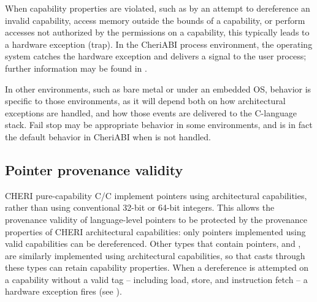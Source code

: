 \documentclass[12pt,twoside,openright,usletter]{article}
\newcommand{\ccode}[1]{{\small\ttfamily{#1}}}
\newcommand{\cuintptrt}{{\ccode{uintptr\_t}}\xspace}
\newcommand{\cintptrt}{{\ccode{intptr\_t}}\xspace}
\newcommand{\SIGPROT}{{\ccode{SIGPROT}}\xspace}
\newcommand{\note}[2]{{\color{blue}[ Note: #1 - #2]}}
\renewcommand{\note}[2]{\relax\ifhmode\unskip\fi}
\newcommand{\arnote}[1]{\note{#1}{Alex R.}}
\newcommand{\rwnote}[1]{\note{#1}{Robert W.}}
\newcommand{\psnote}[1]{\note{#1}{Peter S.}}
\newcommand*{\cpp}[1][]{C\textsmaller[2]{\nolinebreak[4]\hspace{-.05em}\raisebox{.45ex}{\textbf{++}}}}
\newcommand*{\purecapCOrCpp}[1]{CHERI pure-capability C/\cpp{}}
\begin{document}
When capability properties are violated, such as by an attempt to dereference an
invalid capability, access memory outside the bounds of a capability, or perform
accesses not authorized by the permissions on a capability, this typically
leads to a hardware exception (trap).
In the CheriABI process environment, the operating system catches the hardware
exception and delivers a \SIGPROT signal to the user process;
further information may be found in .

In other environments, such as bare metal or under an embedded OS, behavior is
specific to those environments, as it will depend both on how architectural
exceptions are handled, and how those events are delivered to the C-language
stack.
Fail stop may be appropriate behavior in some environments, and is in fact the
default behavior in CheriABI when \SIGPROT is not handled.

\rwnote{We've opted to use the term ``hardware exception'' throughout, and
  mention ``traps'' only here.  This could cause confusion with respect to \cpp{}
  exceptions .. but perhaps less so than if we used the word ``exception''
  unadorned.}

\subsection{Pointer provenance validity}
\label{sec:pointer_provenance_validity}

\purecapCOrCpp{} implement pointers using architectural
capabilities, rather than using conventional 32-bit or 64-bit integers.
This allows the provenance validity of language-level pointers to be
protected by the provenance properties of CHERI architectural capabilities:
only pointers implemented using valid capabilities can be dereferenced.
Other types that contain pointers, \cuintptrt and \cintptrt,
are similarly implemented
using architectural capabilities, so that casts through these types
can retain capability properties.
When a dereference is attempted on a capability without a valid tag --
including load, store, and instruction fetch -- a hardware exception fires
(see ).
\end{document}
